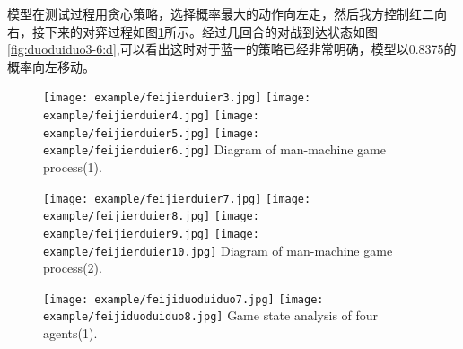 模型在测试过程用贪心策略，选择概率最大的动作向左走，然后我方控制红二向右，接下来的对弈过程如图\ref{fig:duoduiduo3-6}所示。经过几回合的对战到达状态如图\ref{fig:duoduiduo3-6:d},可以看出这时对于蓝一的策略已经非常明确，模型以0.8375的概率向左移动。

\begin{figure}[htbp]
	\centering
	\subcaptionbox{\label{fig2:fig:duoduiduo3-6:a}}
	{\texttt{[image: example/feijierduier3.jpg]}}
	\hspace{0.5em}
	\subcaptionbox{\label{fig:duoduiduo3-6:b}}
	{\texttt{[image: example/feijierduier4.jpg]}}
	\newline
	\centering
	\subcaptionbox{\label{fig:duoduiduo3-6:c}}
	{\texttt{[image: example/feijierduier5.jpg]}}
	\hspace{0.5em}
	\subcaptionbox{\label{fig:duoduiduo3-6:d}}
	{\texttt{[image: example/feijierduier6.jpg]}}
	{Diagram of man-machine game process(1).}
	\label{fig:duoduiduo3-6}
\end{figure}
\begin{figure}[htbp]
	\centering
	\subcaptionbox{\label{fig:duoduiduo9-10:a}}
	{\texttt{[image: example/feijierduier7.jpg]}}
	\hspace{0.5em}
	\subcaptionbox{\label{fig:duoduiduo9-10:b}}
	{\texttt{[image: example/feijierduier8.jpg]}}
	\newline
	\centering
	\subcaptionbox{\label{fig2:fig:duoduiduo9-10:c}}
	{\texttt{[image: example/feijierduier9.jpg]}}
	\hspace{0.5em}
	\subcaptionbox{\label{fig:duoduiduo9-10:d}}
	{\texttt{[image: example/feijierduier10.jpg]}}
	{Diagram of man-machine game process(2).}
	\label{fig:duoduiduo9-10}
\end{figure}

\begin{figure}[hpbt]
	\centering
	{\texttt{[image: example/feijiduoduiduo7.jpg]}}
	\hspace{0.5em}
	{\texttt{[image: example/feijiduoduiduo8.jpg]}}
	{Game state analysis of four agents(1).}
	\label{fig2:duoduiduo}
\end{figure}

